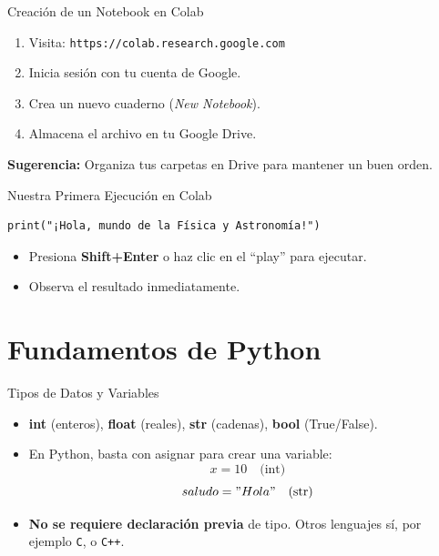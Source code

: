 \documentclass[10pt]{beamer}
\begin{document}
\begin{frame}{Creación de un Notebook en Colab}
  \begin{enumerate}
    \item Visita: \texttt{https://colab.research.google.com}
    \item Inicia sesión con tu cuenta de Google.
    \item Crea un nuevo cuaderno (\emph{New Notebook}).
    \item Almacena el archivo en tu Google Drive.
  \end{enumerate}
  \textbf{Sugerencia:} Organiza tus carpetas en Drive para mantener un buen orden.
\end{frame}

\begin{frame}[fragile]{Nuestra Primera Ejecución en Colab}
\begin{verbatim}
print("¡Hola, mundo de la Física y Astronomía!")
\end{verbatim}
\begin{itemize}
  \item Presiona \textbf{Shift+Enter} o haz clic en el “play” para ejecutar.
  \item Observa el resultado inmediatamente.
\end{itemize}
\end{frame}

\section{Fundamentos de Python}

\begin{frame}{Tipos de Datos y Variables}
  \begin{itemize}
    \item \textbf{int} (enteros), \textbf{float} (reales), \textbf{str} (cadenas), \textbf{bool} (True/False).
    \item En Python, basta con asignar para crear una variable:
          \[
            x = 10 \quad \text{(int)}
          \]
          \[
            saludo = "Hola" \quad \text{(str)}
          \]
    \item \textbf{No se requiere declaración previa} de tipo. Otros lenguajes sí, por ejemplo \texttt{C}, o \texttt{C++}.
  \end{itemize}
\end{frame}
\end{document}
